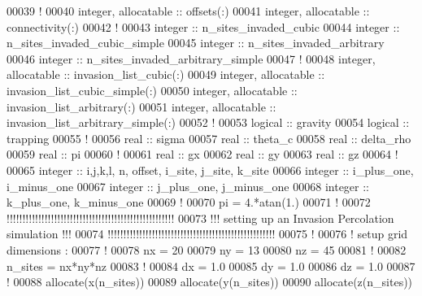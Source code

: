\begin{DoxyCode}
00039 \textcolor{comment}{!}
00040 \textcolor{keywordtype}{integer}, \textcolor{keywordtype}{allocatable} :: offsets(:) 
00041 \textcolor{keywordtype}{integer}, \textcolor{keywordtype}{allocatable} :: connectivity(:) 
00042 \textcolor{comment}{!}
00043 \textcolor{keywordtype}{integer} :: n\_sites\_invaded\_cubic
00044 \textcolor{keywordtype}{integer} :: n\_sites\_invaded\_cubic\_simple
00045 \textcolor{keywordtype}{integer} :: n\_sites\_invaded\_arbitrary
00046 \textcolor{keywordtype}{integer} :: n\_sites\_invaded\_arbitrary\_simple
00047 \textcolor{comment}{!}
00048 \textcolor{keywordtype}{integer}, \textcolor{keywordtype}{allocatable} :: invasion\_list\_cubic(:)
00049 \textcolor{keywordtype}{integer}, \textcolor{keywordtype}{allocatable} :: invasion\_list\_cubic\_simple(:)
00050 \textcolor{keywordtype}{integer}, \textcolor{keywordtype}{allocatable} :: invasion\_list\_arbitrary(:)
00051 \textcolor{keywordtype}{integer}, \textcolor{keywordtype}{allocatable} :: invasion\_list\_arbitrary\_simple(:)
00052 \textcolor{comment}{!}
00053 \textcolor{keywordtype}{logical} :: gravity 
00054 \textcolor{keywordtype}{logical} :: trapping 
00055 \textcolor{comment}{!}
00056 \textcolor{keywordtype}{real} :: sigma
00057 \textcolor{keywordtype}{real} :: theta\_c 
00058 \textcolor{keywordtype}{real} :: delta\_rho 
00059 \textcolor{keywordtype}{real} :: pi
00060 \textcolor{comment}{!}
00061 \textcolor{keywordtype}{real} :: gx
00062 \textcolor{keywordtype}{real} :: gy 
00063 \textcolor{keywordtype}{real} :: gz 
00064 \textcolor{comment}{!}
00065 \textcolor{keywordtype}{integer} :: i,j,k,l, n, offset, i\_site, j\_site, k\_site
00066 \textcolor{keywordtype}{integer} :: i\_plus\_one, i\_minus\_one
00067 \textcolor{keywordtype}{integer} :: j\_plus\_one, j\_minus\_one
00068 \textcolor{keywordtype}{integer} :: k\_plus\_one, k\_minus\_one
00069 \textcolor{comment}{!}
00070 pi = 4.*atan(1.)
00071 \textcolor{comment}{!}
00072 \textcolor{comment}{!!!!!!!!!!!!!!!!!!!!!!!!!!!!!!!!!!!!!!!!!!!!!!!!!!!!!}
00073 \textcolor{comment}{!!! setting up an Invasion Percolation simulation !!!}
00074 \textcolor{comment}{!!!!!!!!!!!!!!!!!!!!!!!!!!!!!!!!!!!!!!!!!!!!!!!!!!!!!}
00075 \textcolor{comment}{!}
00076 \textcolor{comment}{! setup grid dimensions :}
00077 \textcolor{comment}{!}
00078 nx = 20
00079 ny = 13
00080 nz = 45
00081 \textcolor{comment}{!}
00082 n\_sites = nx*ny*nz
00083 \textcolor{comment}{!}
00084 dx = 1.0
00085 dy = 1.0
00086 dz = 1.0
00087 \textcolor{comment}{!}
00088 \textcolor{keyword}{allocate}(x(n\_sites))
00089 \textcolor{keyword}{allocate}(y(n\_sites))
00090 \textcolor{keyword}{allocate}(z(n\_sites))

\end{DoxyCode}
